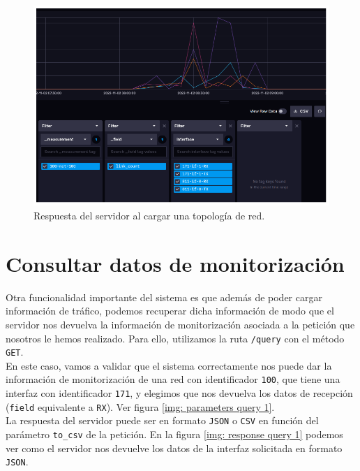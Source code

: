 \documentclass[a4paper, oneside, 12pt]{book}
\begin{document}
	\begin{figure}[h!]
		\begin{center}
			\includegraphics[width=1\textwidth]{diag/influxdb_topology_1.png}
			\caption{Respuesta del servidor al cargar una topología de red.}
			\label{img: influxdb topology 1}
		\end{center}
	\end{figure}
	
	\section{Consultar datos de monitorización}
	
	\noindent Otra funcionalidad importante del sistema es que además de poder cargar información de tráfico, podemos recuperar dicha información de modo que el servidor nos devuelva la información de monitorización asociada a la petición que nosotros le hemos realizado. Para ello, utilizamos la ruta \texttt{/query} con el método \texttt{GET}. \\
	
	\noindent En este caso, vamos a validar que el sistema correctamente nos puede dar la información de monitorización de una red con identificador \texttt{100}, que tiene una interfaz con identificador \texttt{171}, y elegimos que nos devuelva los datos de recepción (\texttt{field} equivalente a \texttt{RX}). Ver figura \ref{img: parameters query 1}. \\
	
	\noindent La respuesta del servidor puede ser en formato \texttt{JSON} o \texttt{CSV} en función del parámetro \texttt{to\_csv} de la petición. En la figura \ref{img: response query 1} podemos ver como el servidor nos devuelve los datos de la interfaz solicitada en formato \texttt{JSON}.
	
\end{document}
